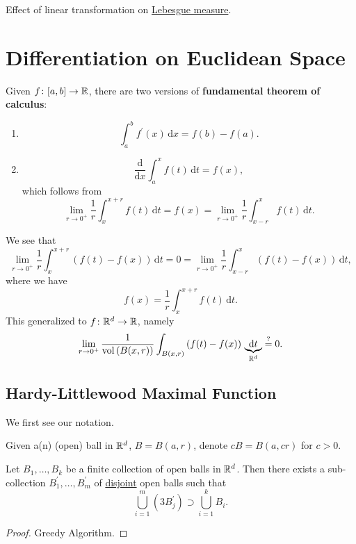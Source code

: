 \begin{theorem}
	Effect of linear transformation on \hyperref[def:Lebesgue-measure]{Lebesgue measure}.
\end{theorem}

\section{Differentiation on Euclidean Space}
\begin{prev}
	Given \(f\colon [a, b]\to \mathbb{\MakeUppercase{r}} \), there are two versions of \textbf{fundamental theorem of calculus}:
	\begin{enumerate}
		\item
		      \[
			      \int_{a}^{b} f^\prime (x) \,\mathrm{d}x = f(b) - f(a).
		      \]
		\item
		      \[
			      \frac{\mathrm{d}}{\mathrm{d}x} \int_{a}^{x} f(t) \,\mathrm{d}t = f(x),
		      \]
		      which follows from
		      \[
			      \lim\limits_{r \to 0^+} \frac{1}{r}\int_{x}^{x+r} f(t) \,\mathrm{d}t = f(x) = \lim\limits_{r \to 0^+} \frac{1}{r}\int_{x-r}^{x} f(t) \,\mathrm{d}t.
		      \]
	\end{enumerate}
\end{prev}
\begin{remark}
	We see that
	\[
		\lim\limits_{r \to 0^+} \frac{1}{r}\int_{x}^{x+r} \left(f(t)-f(x)\right) \,\mathrm{d}t = 0 = \lim\limits_{r \to 0^+} \frac{1}{r}\int_{x-r}^{x} \left(f(t)-f(x)\right) \,\mathrm{d}t,
	\]
	where we have
	\[
		f(x) = \frac{1}{r}\int_{x}^{x+r} f(t) \,\mathrm{d}t.
	\]
	This generalized to \(f\colon \mathbb{\MakeUppercase{r}} ^d\to \mathbb{\MakeUppercase{r}} \), namely
	\[
		\lim\limits_{r \to 0^+} \frac{1}{\mathrm{vol} \left(B(x, r)\right)}\int_{B(x, r)}\left(f(t)-f(x)\right)\,\underbrace{\mathrm{d}t}_{\mathbb{\MakeUppercase{r}} ^d} \overset{?}{=} 0.
	\]
\end{remark}
\subsection{Hardy-Littlewood Maximal Function}
We first see our notation.
\begin{notation}
	Given a(n) (open) ball in \(\mathbb{\MakeUppercase{r}} ^d\), \(B = B(a, r)\), denote \(cB = B(a, cr)\) for \(c>0\).
\end{notation}

\begin{lemma}\label{lma:Vitali-type-covering-lemma}
	Let \(B_1, \ldots , B_k \) be a finite collection of open balls in \(\mathbb{\MakeUppercase{r}} ^d\). Then there
	exists a sub-collection \(B^\prime _1, \ldots , B^\prime _m \) of \underline{disjoint} open balls such that
	\[
		\bigcup\limits_{i=1}^{m} \left(3 B_{j} ^\prime \right)\supset \bigcup\limits_{i=1}^{k} B_{i}.
	\]
\end{lemma}
\begin{proof}
	Greedy Algorithm.
\end{proof}